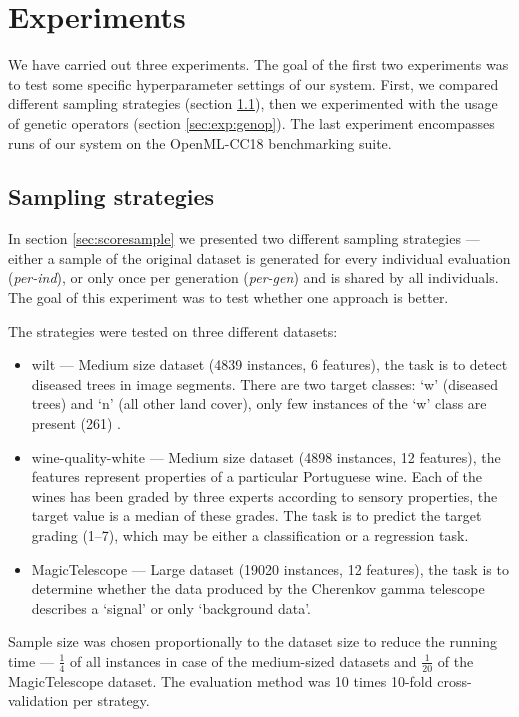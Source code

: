 \chapter{Experiments} \label{experiments}
We have carried out three experiments. The goal of the first two experiments was
to test some specific hyperparameter settings of our system. First, we compared
different sampling strategies (section \ref{sec:exp:sample}), then we
experimented with the usage of genetic operators (section \ref{sec:exp:genop}).
The last experiment encompasses runs of our system on the OpenML-CC18 benchmarking
suite.

\section{Sampling strategies} \label{sec:exp:sample}
In section \ref{sec:scoresample} we presented two different sampling strategies
--- either a sample of the original dataset is generated for every individual
evaluation (\emph{per-ind}), or only once per generation (\emph{per-gen}) and
is shared by all individuals. The goal of this experiment was to test whether
one approach is better.

The strategies were tested on three different datasets:
\begin{itemize}
\item wilt --- Medium size dataset (4839 instances, 6 features), the task is to
detect diseased trees in image segments. There are two target classes: `w' (diseased
trees) and `n' (all other land cover), only few instances of the `w' class
are present (261) \citep{doi:10.1080/01431161.2013.810825}.
\item wine-quality-white --- Medium size dataset (4898 instances, 12 features),
the features represent properties of a particular Portuguese wine. Each of the
wines has been graded by three experts according to sensory properties, the
target value is a median of these grades. The task is to predict the target
grading (1--7), which may be either a classification or a regression task.
\citep{CORTEZ2009547}
\item MagicTelescope --- Large dataset (19020 instances, 12 features), the task
is to determine whether the data produced by the Cherenkov gamma telescope
describes a `signal' or only `background data'. \citep{BOCK2004511}
\end{itemize}

Sample size was chosen proportionally to the dataset size to reduce the running
time --- $\frac{1}{4}$ of all instances in case of the medium-sized datasets
and $\frac{1}{20}$ of the MagicTelescope dataset. The evaluation method
was 10 times 10-fold cross-validation per strategy.


